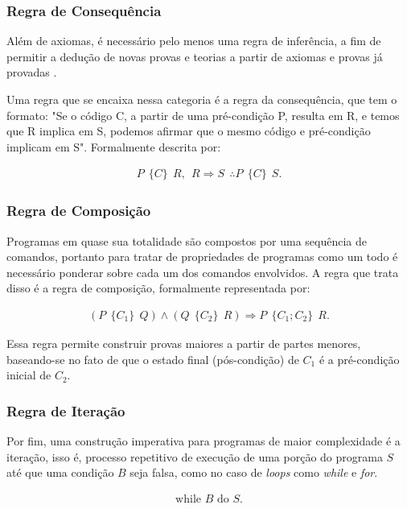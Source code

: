 \documentclass{article}
\begin{document}
\subsubsection{Regra de Consequência}

Além de axiomas, é necessário pelo menos uma regra de inferência, a fim de permitir a dedução de novas provas e teorias a partir de axiomas e provas já provadas \cite{hoare1969axiomatic}. 

Uma regra que se encaixa nessa categoria é a regra da consequência, que tem o formato: "Se o código C, a partir de uma pré-condição P, resulta em R, e temos que R implica em S, podemos afirmar que o mesmo código e pré-condição implicam em S". Formalmente descrita por:

\begin{align}
    P \ \ \{C\} \ \ R, \ \ R \Rightarrow S \ \ \therefore P \ \ \{C\} \ \ S.
\end{align}

\subsubsection{Regra de Composição}

Programas em quase sua totalidade são compostos por uma sequência de comandos, portanto para tratar de propriedades de programas como um todo é necessário ponderar sobre cada um dos comandos envolvidos. A regra que trata disso é a regra de composição, formalmente representada por:

\begin{align}
    \left(P \ \ \{C_1\} \ \ Q\right) \land (Q \ \ \{C_2\} \ \ R) \Rightarrow P \ \ \{C_1;C_2\} \ \ R.
\end{align}

Essa regra permite construir provas maiores a partir de partes menores, baseando-se no fato de que o estado final (pós-condição) de \( C_1 \) é a pré-condição inicial de \( C_2 \).

\subsubsection{Regra de Iteração}

Por fim, uma construção imperativa para programas de maior complexidade é a iteração, isso é, processo repetitivo de execução de uma porção do programa $S$ até que uma condição $B$ seja falsa, como no caso de \emph{loops} como \emph{while} e \emph{for}. 

\begin{align}
    \text{while } B \text{ do } S.
\end{align}
\end{document}
